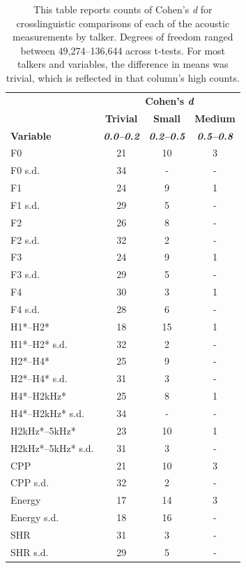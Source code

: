 \begin{table}[htbp]
\caption{This table reports counts of Cohen's \textit{d} for crosslinguistic comparisons of each of the acoustic measurements by talker. Degrees of freedom ranged between 49,274--136,644 across t-tests. For most talkers and variables, the difference in means was trivial, which is reflected in that column's high counts.}
\label{ch3:tab:cohend}
\centering
\begin{tabular}{lccc}
\toprule
         & \multicolumn{3}{c}{\textbf{Cohen's \textit{d}}} \\
         & \textbf{Trivial} & \textbf{Small} & \textbf{Medium} \\
\textbf{Variable} & \textbf{\textit{0.0--0.2}} & \textbf{\textit{0.2--0.5}} & \textbf{\textit{0.5--0.8}} \\ 
\midrule
F0	        &	21	&	10	&	3	\\
F0 s.d.	    &	34	&	-	&	-	\\
F1	        &	24	&	9	&	1	\\
F1 s.d.	    &	29	&	5	&	-	\\
F2	        &	26	&	8	&	-	\\
F2 s.d.	    &	32	&	2	&	-	\\
F3	        &	24	&	9	&	1	\\
F3 s.d.	    &	29	&	5	&	-	\\
F4	        &	30	&	3	&	1	\\
F4 s.d.	    &	28	&	6	&	-	\\
H1*--H2*	    &	18	&	15	&	1	\\
H1*--H2* s.d.	&	32	&	2	&	-	\\
H2*--H4*	    &	25	&	9	&	-	\\
H2*--H4* s.d.	&	31	&	3	&	-	\\
H4*--H2kHz* 	    &	25	&	8	&	1	\\
H4*--H2kHz*  s.d.	&	34	&	-	&	-	\\
H2kHz*--5kHz*	    &	23	&	10	&	1	\\
H2kHz*--5kHz* s.d.	&	31	&	3	&	-	\\
CPP	        &	21	&	10	&	3	\\
CPP s.d.	&	32	&	2	&	-	\\
Energy	    &	17	&	14	&	3	\\
Energy s.d.	&	18	&	16	&	-	\\
SHR	        &	31	&	3	&	-	\\
SHR s.d.	&	29	&	5	&	- \\
\bottomrule
\end{tabular}
\end{table}

